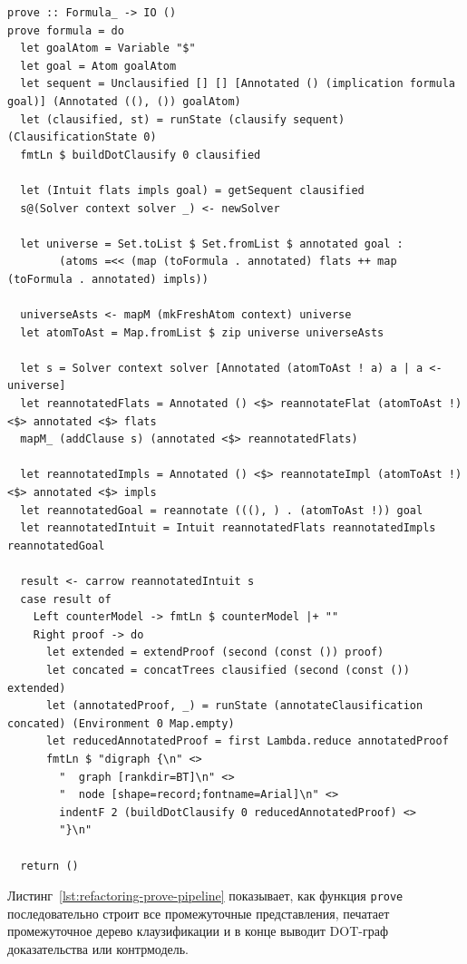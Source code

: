 \documentclass[14pt, russian]{scrartcl}
\begin{document}
\begin{listing}[!htb]
\caption{Функция \texttt{prove}: общий конвейер доказательства}
\label{lst:refactoring-prove-pipeline}
\begin{verbatim}
prove :: Formula_ -> IO ()
prove formula = do
  let goalAtom = Variable "$"
  let goal = Atom goalAtom
  let sequent = Unclausified [] [] [Annotated () (implication formula goal)] (Annotated ((), ()) goalAtom)
  let (clausified, st) = runState (clausify sequent) (ClausificationState 0)
  fmtLn $ buildDotClausify 0 clausified

  let (Intuit flats impls goal) = getSequent clausified
  s@(Solver context solver _) <- newSolver

  let universe = Set.toList $ Set.fromList $ annotated goal :
        (atoms =<< (map (toFormula . annotated) flats ++ map (toFormula . annotated) impls))

  universeAsts <- mapM (mkFreshAtom context) universe
  let atomToAst = Map.fromList $ zip universe universeAsts

  let s = Solver context solver [Annotated (atomToAst ! a) a | a <- universe]
  let reannotatedFlats = Annotated () <$> reannotateFlat (atomToAst !) <$> annotated <$> flats
  mapM_ (addClause s) (annotated <$> reannotatedFlats)

  let reannotatedImpls = Annotated () <$> reannotateImpl (atomToAst !) <$> annotated <$> impls
  let reannotatedGoal = reannotate (((), ) . (atomToAst !)) goal
  let reannotatedIntuit = Intuit reannotatedFlats reannotatedImpls reannotatedGoal

  result <- carrow reannotatedIntuit s
  case result of
    Left counterModel -> fmtLn $ counterModel |+ ""
    Right proof -> do
      let extended = extendProof (second (const ()) proof)
      let concated = concatTrees clausified (second (const ()) extended)
      let (annotatedProof, _) = runState (annotateClausification concated) (Environment 0 Map.empty)
      let reducedAnnotatedProof = first Lambda.reduce annotatedProof
      fmtLn $ "digraph {\n" <>
        "  graph [rankdir=BT]\n" <>
        "  node [shape=record;fontname=Arial]\n" <>
        indentF 2 (buildDotClausify 0 reducedAnnotatedProof) <>
        "}\n"

  return ()
\end{verbatim}
\end{listing}

Листинг~\ref{lst:refactoring-prove-pipeline} показывает, как функция
\texttt{prove} последовательно строит все промежуточные представления, печатает
промежуточное дерево клаузификации и в конце выводит DOT-граф доказательства или
контрмодель.
\end{document}
